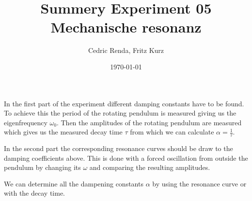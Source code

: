 \documentclass[12pt,a4paper]{article}
\title{Summery Experiment 05 Mechanische resonanz}
\author{Cedric Renda, Fritz Kurz}
\date{\today }
\begin{document}
\maketitle
In the first part of the experiment different damping constants have to be found. 
To achieve this the period of the rotating pendulum is measured giving us the eigenfrequency $\omega_0$.
Then the amplitudes of the rotating pendulum are measured which gives us the measured decay time $\tau$ from which we can calculate $\alpha=\frac{1}{\tau}$.


In the second part the corresponding resonance curves should be draw to the damping coefficients above.
This is done with a forced oscillation from outside the pendulum by changing its $\omega$ and comparing the resulting amplitudes.


We can determine all the dampening constants $\alpha$ by using the resonance curve or with the decay time.
 

 
\end{document}
